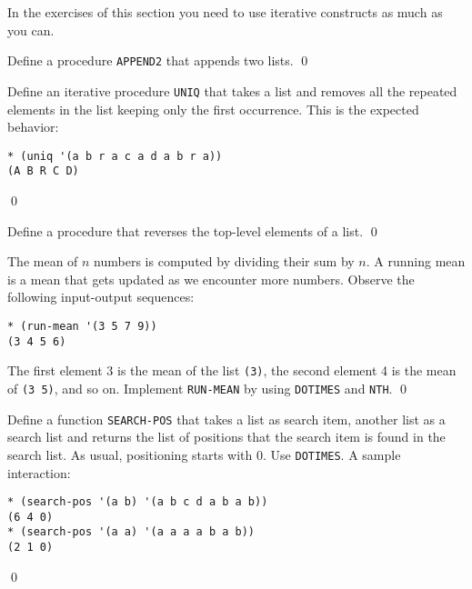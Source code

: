 \documentclass[a4paper,11pt]{article}
\begin{document}
\begin{uenum}

\end{uenum}


\noindent In the exercises of this section you need to use iterative constructs as much as you can.

\begin{uexercise}
Define a procedure \Verb+APPEND2+ that appends two lists. 
\qed
\end{uexercise}

\begin{uexercise}
Define an iterative procedure \Verb+UNIQ+ that takes a list and removes all the repeated elements in the list keeping only the first occurrence. This is the expected behavior:

\begin{Verbatim}
* (uniq '(a b r a c a d a b r a))
(A B R C D)
\end{Verbatim}
\qed
\end{uexercise}

\begin{uexercise}
Define a procedure that reverses the top-level elements of a list.
\qed
\end{uexercise}

\begin{uexercise}
The mean of $n$ numbers is computed by dividing their sum by $n$. A running mean is a mean that gets updated as we encounter more numbers. Observe the following input-output sequences:

\begin{Verbatim}
* (run-mean '(3 5 7 9))
(3 4 5 6)
\end{Verbatim}

The first element 3 is the mean of the list \Verb+(3)+, the second element 4 is the mean of \Verb+(3 5)+, and so on. Implement \Verb+RUN-MEAN+ by using \Verb+DOTIMES+ and \Verb+NTH+.
\qed
\end{uexercise}

\begin{uexercise}
Define a function \Verb+SEARCH-POS+ that takes a list as search item, another list as a search list and returns the list of positions that the search item is found in the search list. As usual, positioning starts with 0. Use \Verb+DOTIMES+. A sample interaction:

{\small
\begin{Verbatim}
* (search-pos '(a b) '(a b c d a b a b))
(6 4 0)
* (search-pos '(a a) '(a a a a b a b))
(2 1 0)
\end{Verbatim}
}
\qed
\end{uexercise}
\end{document}
